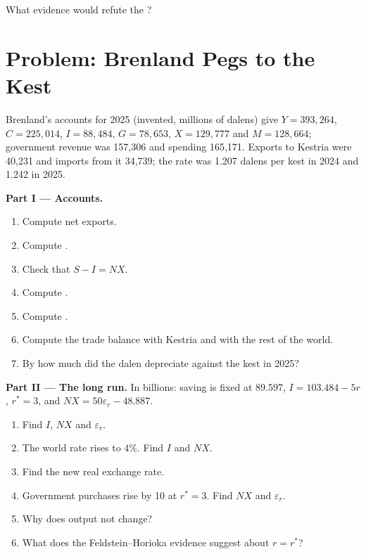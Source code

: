 \begin{exercise}[$\star\star\star$]\label{exo:b1:open-economy:refute}
What evidence would refute the ?
\end{exercise}

\section{Problem: Brenland Pegs to the Kest}\label{sec:b1:open-economy:problem}

\begin{problem}\label{pb:b1:open-economy:peg}
Brenland's accounts for 2025 (invented, millions of dalens) give $Y = 393{,}264$,
$C = 225{,}014$, $I = 88{,}484$, $G = 78{,}653$, $X = 129{,}777$ and $M = 128{,}664$; government revenue was
157,306 and spending 165,171. Exports to Kestria were 40,231 and imports from
it 34,739; the rate was 1.207 dalens per kest in 2024 and 1.242 in 2025.

\medskip\noindent\textbf{Part I --- Accounts.}
\begin{enumerate}
  \item Compute net exports.
  \item Compute .
  \item Check that $S - I = NX$.
  \item Compute .
  \item Compute .
  \item Compute the trade balance with Kestria and with the rest of the world.
  \item By how much did the dalen depreciate against the kest in 2025?
\end{enumerate}

\medskip\noindent\textbf{Part II --- The long run.} In billions: saving is fixed at
89.597, $I = 103.484 - 5r$, $r^* = 3$, and $NX = 50\varepsilon_r - 48.887$.
\begin{enumerate}[resume]
  \item Find $I$, $NX$ and $\varepsilon_r$.
  \item The world rate rises to $4\%$. Find $I$ and $NX$.
  \item Find the new real exchange rate.
  \item Government purchases rise by 10 at $r^* = 3$. Find $NX$ and $\varepsilon_r$.
  \item Why does output not change?
  \item What does the Feldstein--Horioka evidence suggest about $r = r^*$?
\end{enumerate}


\end{problem}
